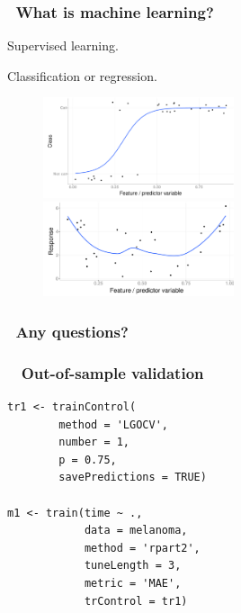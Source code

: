 \documentclass[handout, aspectratio = 169]{beamer}
\begin{document}
\begin{frame}
\frametitle{\insertframenumber~What is machine learning?}
Supervised learning.

Classification or regression.
\begin{figure}
    \includegraphics[width = 0.5\textwidth]{classification}%
    \includegraphics[width = 0.5\textwidth]{regression}
\end{figure} 

\end{frame} 





\begin{frame}
\frametitle{\insertframenumber~Any questions?}


\end{frame} 







\begin{frame}[fragile]
\frametitle{\insertframenumber~ Out-of-sample validation}
\renewcommand{\FancyVerbFormatLine}[1]{%
   \ifnum\value{FancyVerbLine}=2\color{cyan}#1%
   \else #1\fi}
\begin{Verbatim}
tr1 <- trainControl(
        method = 'LGOCV',
        number = 1,
        p = 0.75,
        savePredictions = TRUE)

m1 <- train(time ~ ., 
            data = melanoma,
            method = 'rpart2',
            tuneLength = 3,
            metric = 'MAE',
            trControl = tr1)
            
\end{Verbatim}

\end{frame} 
\end{document}
